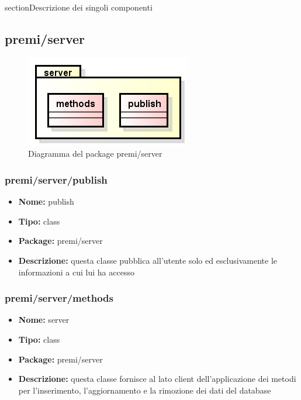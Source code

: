 section{Descrizione dei singoli componenti}

\subsection{premi/server}
\begin{figure}[h]
\begin{center}
\includegraphics[scale=0.45]{img/diapkg/server.png}
\caption{Diagramma del package premi/server}
\end{center}
\end{figure}

\subsubsection{premi/server/publish}
\begin{itemize}
  \item[] \textbf{Nome:} publish
  \item[] \textbf{Tipo:} class
  \item[] \textbf{Package:} premi/server
  \item[] \textbf{Descrizione:} questa classe pubblica all'utente solo ed esclusivamente le informazioni a cui lui ha accesso
\end{itemize}


\subsubsection{premi/server/methods}
\begin{itemize}
  \item[] \textbf{Nome:} server
  \item[] \textbf{Tipo:} class
  \item[] \textbf{Package:} premi/server
  \item[] \textbf{Descrizione:} questa classe fornisce al lato client dell'applicazione dei metodi per l'inserimento, l'aggiornamento e la rimozione dei dati del database
\end{itemize}





